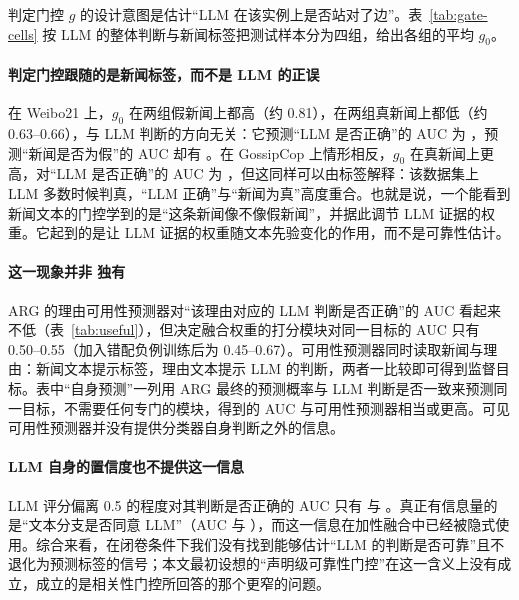 判定门控 $g$ 的设计意图是估计“LLM 在该实例上是否站对了边”。表~\ref{tab:gate-cells} 按 LLM 的整体判断与新闻标签把测试样本分为四组，给出各组的平均 $g_0$。

\begin{table}[!htbp]
\centering\small
\caption{判定门控在整体实例上的取值（测试集，多种子均值）。若门控跟随“LLM 是否正确”，则第一、四行应高，第二、三行应低。}\label{tab:gate-cells}
\end{table}

\paragraph{判定门控跟随的是新闻标签，而不是 LLM 的正误}
在 Weibo21 上，$g_0$ 在两组假新闻上都高（约 0.81），在两组真新闻上都低（约 0.63--0.66），与 LLM 判断的方向无关：它预测“LLM 是否正确”的 AUC 为 ，预测“新闻是否为假”的 AUC 却有 。在 GossipCop 上情形相反，$g_0$ 在真新闻上更高，对“LLM 是否正确”的 AUC 为 ，但这同样可以由标签解释：该数据集上 LLM 多数时候判真，“LLM 正确”与“新闻为真”高度重合。也就是说，一个能看到新闻文本的门控学到的是“这条新闻像不像假新闻”，并据此调节 LLM 证据的权重。它起到的是让 LLM 证据的权重随文本先验变化的作用，而不是可靠性估计。

\paragraph{这一现象并非 \method{} 独有}
ARG 的理由可用性预测器对“该理由对应的 LLM 判断是否正确”的 AUC 看起来不低（表~\ref{tab:useful}），但决定融合权重的打分模块对同一目标的 AUC 只有 0.50--0.55（加入错配负例训练后为 0.45--0.67）。可用性预测器同时读取新闻与理由：新闻文本提示标签，理由文本提示 LLM 的判断，两者一比较即可得到监督目标。表中“自身预测”一列用 ARG 最终的预测概率与 LLM 判断是否一致来预测同一目标，不需要任何专门的模块，得到的 AUC 与可用性预测器相当或更高。可见可用性预测器并没有提供分类器自身判断之外的信息。

\begin{table}[!htbp]
\centering\small
\caption{对“该理由对应的 LLM 判断是否正确”的 AUC（测试集，多种子均值）：ARG 的可用性预测器、融合权重，以及“ARG 自身的最终预测与 LLM 判断是否一致”。}\label{tab:useful}
\end{table}

\paragraph{LLM 自身的置信度也不提供这一信息}
LLM 评分偏离 0.5 的程度对其判断是否正确的 AUC 只有  与 。真正有信息量的是“文本分支是否同意 LLM”（AUC  与 ），而这一信息在加性融合中已经被隐式使用。综合来看，在闭卷条件下我们没有找到能够估计“LLM 的判断是否可靠”且不退化为预测标签的信号；本文最初设想的“声明级可靠性门控”在这一含义上没有成立，成立的是相关性门控所回答的那个更窄的问题。

